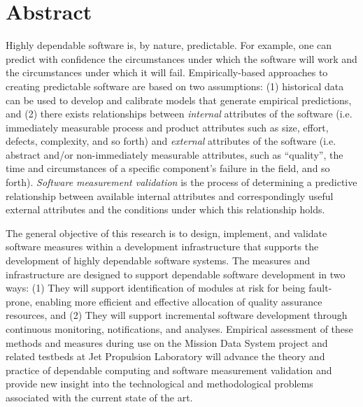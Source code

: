 
\section{Abstract}

Highly dependable software is, by nature, predictable.  For example, one
can predict with confidence the circumstances under which the software will
work and the circumstances under which it will fail.  Empirically-based
approaches to creating predictable software are based on two assumptions:
(1) historical data can be used to develop and calibrate models that
generate empirical predictions, and (2) there exists relationships between
{\em internal} attributes of the software (i.e.  immediately measurable
process and product attributes such as size, effort, defects, complexity,
and so forth) and {\em external} attributes of the software (i.e. abstract
and/or non-immediately measurable attributes, such as ``quality'', the time
and circumstances of a specific component's failure in the field, and so
forth).  {\em Software measurement validation} is the process of
determining a predictive relationship between available internal attributes
and correspondingly useful external attributes and the conditions under
which this relationship holds.


The general objective of this research is to design, implement, and
validate software measures within a development infrastructure that
supports the development of highly dependable software systems. The
measures and infrastructure are designed to support dependable software
development in two ways: (1) They will support identification of modules at
risk for being fault-prone, enabling more efficient and effective
allocation of quality assurance resources, and (2) They will support
incremental software development through continuous monitoring,
notifications, and analyses.  Empirical assessment of these methods and
measures during use on the Mission Data System project and related testbeds
at Jet Propulsion Laboratory will advance the theory and practice of
dependable computing and software measurement validation and provide new
insight into the technological and methodological problems associated with
the current state of the art.

 







